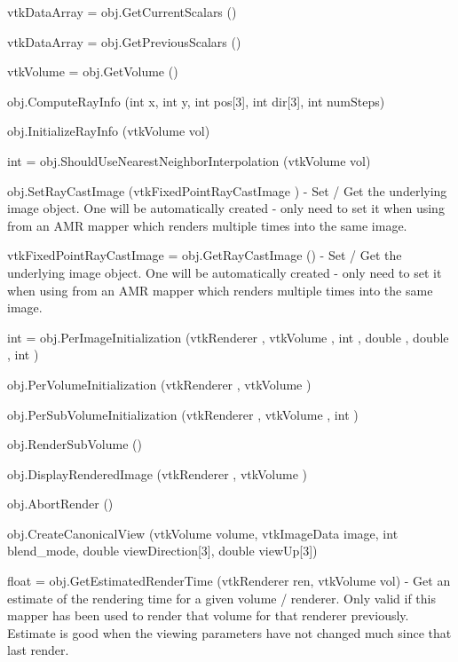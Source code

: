 \begin{DoxyItemize}
\item {\ttfamily vtk\-Data\-Array = obj.\-Get\-Current\-Scalars ()}  
\item {\ttfamily vtk\-Data\-Array = obj.\-Get\-Previous\-Scalars ()}  
\item {\ttfamily vtk\-Volume = obj.\-Get\-Volume ()}  
\item {\ttfamily obj.\-Compute\-Ray\-Info (int x, int y, int pos\mbox{[}3\mbox{]}, int dir\mbox{[}3\mbox{]}, int num\-Steps)}  
\item {\ttfamily obj.\-Initialize\-Ray\-Info (vtk\-Volume vol)}  
\item {\ttfamily int = obj.\-Should\-Use\-Nearest\-Neighbor\-Interpolation (vtk\-Volume vol)}  
\item {\ttfamily obj.\-Set\-Ray\-Cast\-Image (vtk\-Fixed\-Point\-Ray\-Cast\-Image )} -\/ Set / Get the underlying image object. One will be automatically created -\/ only need to set it when using from an A\-M\-R mapper which renders multiple times into the same image.  
\item {\ttfamily vtk\-Fixed\-Point\-Ray\-Cast\-Image = obj.\-Get\-Ray\-Cast\-Image ()} -\/ Set / Get the underlying image object. One will be automatically created -\/ only need to set it when using from an A\-M\-R mapper which renders multiple times into the same image.  
\item {\ttfamily int = obj.\-Per\-Image\-Initialization (vtk\-Renderer , vtk\-Volume , int , double , double , int )}  
\item {\ttfamily obj.\-Per\-Volume\-Initialization (vtk\-Renderer , vtk\-Volume )}  
\item {\ttfamily obj.\-Per\-Sub\-Volume\-Initialization (vtk\-Renderer , vtk\-Volume , int )}  
\item {\ttfamily obj.\-Render\-Sub\-Volume ()}  
\item {\ttfamily obj.\-Display\-Rendered\-Image (vtk\-Renderer , vtk\-Volume )}  
\item {\ttfamily obj.\-Abort\-Render ()}  
\item {\ttfamily obj.\-Create\-Canonical\-View (vtk\-Volume volume, vtk\-Image\-Data image, int blend\-\_\-mode, double view\-Direction\mbox{[}3\mbox{]}, double view\-Up\mbox{[}3\mbox{]})}  
\item {\ttfamily float = obj.\-Get\-Estimated\-Render\-Time (vtk\-Renderer ren, vtk\-Volume vol)} -\/ Get an estimate of the rendering time for a given volume / renderer. Only valid if this mapper has been used to render that volume for that renderer previously. Estimate is good when the viewing parameters have not changed much since that last render.  

\end{DoxyItemize}
